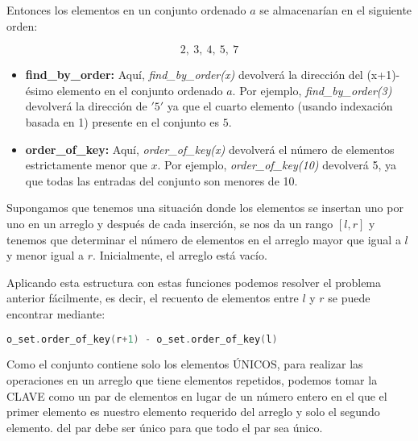 Entonces los elementos en un conjunto ordenado $a$ se almacenarían en el siguiente orden:

$$2,~3,~4,~5,~7$$

\begin{itemize}
	\item \textbf{find\_by\_order:} Aquí, \emph{find\_by\_order(x)} devolverá la dirección del (x+1)-ésimo elemento en el conjunto ordenado $a$. Por ejemplo, \emph{find\_by\_order(3)} devolverá la dirección de $'5'$ ya que el cuarto elemento (usando indexación basada en 1) presente en el conjunto es $5$.
	
	\item \textbf{order\_of\_key:} Aquí, \emph{order\_of\_key(x)} devolverá el número de elementos estrictamente menor que $x$. Por ejemplo, \emph{order\_of\_key(10)} devolverá 5, ya que todas las entradas del conjunto son menores de 10. 
\end{itemize}

Supongamos que tenemos una situación donde los elementos se insertan uno por uno en un arreglo y después de cada inserción, se nos da un rango $[l, r]$ y tenemos que determinar el número de elementos en el arreglo mayor que igual a $l$ y menor igual a $r$. Inicialmente, el  arreglo está vacío. 

Aplicando esta estructura con estas funciones podemos resolver el problema anterior fácilmente, es decir, el recuento de elementos entre $l$ y $r$ se puede encontrar mediante:

\begin{lstlisting}[language=C++]
o_set.order_of_key(r+1) - o_set.order_of_key(l)
\end{lstlisting}

Como el conjunto contiene solo los elementos ÚNICOS, para realizar las operaciones en un arreglo que tiene elementos repetidos, podemos tomar la CLAVE como un par de elementos en lugar de un número entero en el que el primer elemento es nuestro elemento requerido del arreglo y solo el segundo elemento. del par debe ser único para que todo el par sea único.
